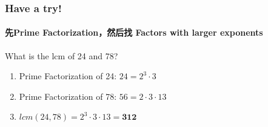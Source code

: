 \documentclass[
	11pt, %
	handout,
]{beamer}
\begin{document}

\begin{frame}
	\frametitle{Have a try!}
	\framesubtitle{先Prime Factorization，然后找 Factors with larger exponents}
		What is the lcm of 24 and 78?
		 \pause
		 \begin{enumerate}
		 	\item Prime Factorization of 24: $24=2^3 \cdot 3$ \pause
		 	\item Prime Factorization of 78: $56=2 \cdot 3 \cdot 13$ \pause
		 	\item  $lcm(24, 78) = 2^3 \cdot 3 \cdot 13 = \textbf{312}$ 
		 	\end{enumerate}
\end{frame}

\end{document}
